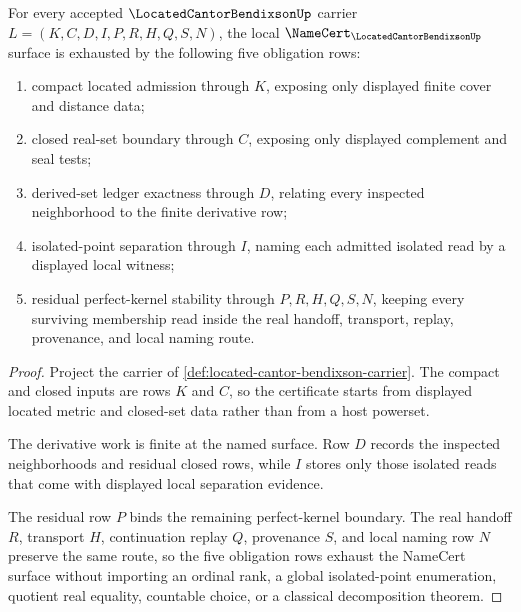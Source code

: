 \begin{theorem}
\label{thm:located-cantor-bendixson-namecert-obligations}
For every accepted $\LocatedCantorBendixsonUp$ carrier $L=(K,C,D,I,P,R,H,Q,S,N)$, the local $\NameCert_{\LocatedCantorBendixsonUp}$ surface is exhausted by the following five obligation rows:
\begin{enumerate}
\item compact located admission through $K$, exposing only displayed finite cover and distance data;
\item closed real-set boundary through $C$, exposing only displayed complement and seal tests;
\item derived-set ledger exactness through $D$, relating every inspected neighborhood to the finite derivative row;
\item isolated-point separation through $I$, naming each admitted isolated read by a displayed local witness;
\item residual perfect-kernel stability through $P,R,H,Q,S,N$, keeping every surviving membership read inside the real handoff, transport, replay, provenance, and local naming route.
\end{enumerate}
\end{theorem}
\begin{proof}
Project the carrier of \autoref{def:located-cantor-bendixson-carrier}. The compact and closed inputs are rows $K$ and $C$, so the certificate starts from displayed located metric and closed-set data rather than from a host powerset.

The derivative work is finite at the named surface. Row $D$ records the inspected neighborhoods and residual closed rows, while $I$ stores only those isolated reads that come with displayed local separation evidence.

The residual row $P$ binds the remaining perfect-kernel boundary. The real handoff $R$, transport $H$, continuation replay $Q$, provenance $S$, and local naming row $N$ preserve the same route, so the five obligation rows exhaust the NameCert surface without importing an ordinal rank, a global isolated-point enumeration, quotient real equality, countable choice, or a classical decomposition theorem.
\end{proof}

